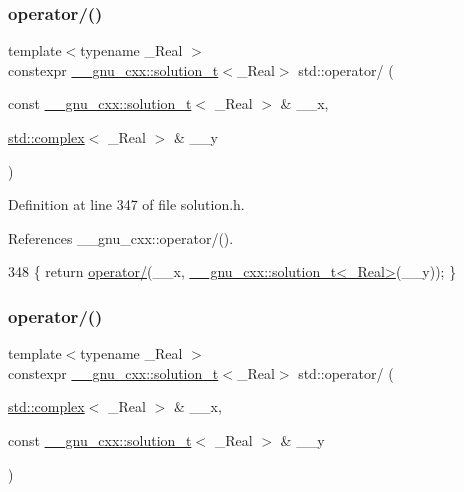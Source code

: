 \subsubsection{\texorpdfstring{operator/()}{operator/()}\hspace{0.1cm}{\footnotesize\ttfamily [4/5]}}
{\footnotesize\ttfamily template$<$typename \+\_\+\+Real $>$ \\
constexpr \hyperlink{namespace____gnu__cxx_ae20ea642de50eb361074c62676b0159c}{\+\_\+\+\_\+gnu\+\_\+cxx\+::solution\+\_\+t}$<$\+\_\+\+Real$>$ std\+::operator/ (\begin{DoxyParamCaption}\item[{const \hyperlink{namespace____gnu__cxx_ae20ea642de50eb361074c62676b0159c}{\+\_\+\+\_\+gnu\+\_\+cxx\+::solution\+\_\+t}$<$ \+\_\+\+Real $>$ \&}]{\+\_\+\+\_\+x,  }\item[{\hyperlink{classstd_1_1complex}{std\+::complex}$<$ \+\_\+\+Real $>$ \&}]{\+\_\+\+\_\+y }\end{DoxyParamCaption})}



Definition at line 347 of file solution.\+h.



References \+\_\+\+\_\+gnu\+\_\+cxx\+::operator/().


\begin{DoxyCode}
348     \{ \textcolor{keywordflow}{return} \hyperlink{namespacestd_a51cf4f07903a8d424249d8198c73843d}{operator/}(\_\_x, \hyperlink{namespace____gnu__cxx_ae20ea642de50eb361074c62676b0159c}{\_\_gnu\_cxx::solution\_t<\_Real>}(\_\_y)); \}
\end{DoxyCode}
\mbox{\label{namespacestd_a51cf4f07903a8d424249d8198c73843d}} 
\subsubsection{\texorpdfstring{operator/()}{operator/()}\hspace{0.1cm}{\footnotesize\ttfamily [5/5]}}
{\footnotesize\ttfamily template$<$typename \+\_\+\+Real $>$ \\
constexpr \hyperlink{namespace____gnu__cxx_ae20ea642de50eb361074c62676b0159c}{\+\_\+\+\_\+gnu\+\_\+cxx\+::solution\+\_\+t}$<$\+\_\+\+Real$>$ std\+::operator/ (\begin{DoxyParamCaption}\item[{\hyperlink{classstd_1_1complex}{std\+::complex}$<$ \+\_\+\+Real $>$ \&}]{\+\_\+\+\_\+x,  }\item[{const \hyperlink{namespace____gnu__cxx_ae20ea642de50eb361074c62676b0159c}{\+\_\+\+\_\+gnu\+\_\+cxx\+::solution\+\_\+t}$<$ \+\_\+\+Real $>$ \&}]{\+\_\+\+\_\+y }\end{DoxyParamCaption})}



